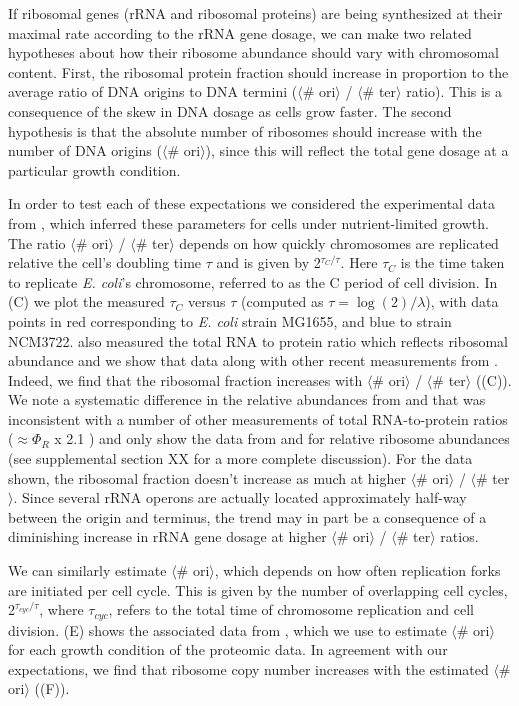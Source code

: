 If ribosomal genes (rRNA and ribosomal proteins) are being synthesized at
their maximal rate according to the rRNA gene dosage, we can make two related
hypotheses about how their ribosome abundance should vary with chromosomal
content. First, the ribosomal protein fraction should increase in proportion
to the average ratio of DNA origins to DNA termini ($\langle$\# ori$\rangle$
/ $\langle$\# ter$\rangle$ ratio). This is a consequence of the skew in DNA
dosage as cells grow faster. The second hypothesis is that the absolute
number of ribosomes should increase with the number of DNA origins
($\langle$\# ori$\rangle$), since this will reflect the total gene dosage at
a particular growth condition.

In order to test each of these expectations we considered the experimental data
from \cite{si2017}, which inferred these parameters for cells under
nutrient-limited growth. The ratio $\langle$\# ori$\rangle$ / $\langle$\#
ter$\rangle$ depends on how quickly chromosomes are replicated relative the
cell's doubling time $\tau$ and is given by 2$^{\tau_C / \tau}$. Here $\tau_C$
is the time taken to replicate \textit{E. coli}'s chromosome, referred to as the
C period of cell division.  In (C) we plot the measured
$\tau_C$ versus $\tau$ (computed as $\tau = \log (2) / \lambda$), with data
points in red corresponding to \textit{E. coli} strain MG1655, and blue to
strain NCM3722. \cite{si2017} also measured the total RNA to protein ratio
which reflects ribosomal abundance and we show that data along with other recent
measurements from \cite{dai2016,dai2018}. Indeed, we find that the ribosomal
fraction increases with $\langle$\# ori$\rangle$ / $\langle$\# ter$\rangle$
((C)). We note a systematic difference in the relative
abundances from \cite{peebo2015} and \cite{valgepea2013} that was inconsistent
with a number of other measurements of total RNA-to-protein ratios ($\approx
\Phi_R$ x 2.1 \cite{dai2016}) and only show the data from \cite{schmidt2016} and
\cite{li2014} for relative ribosome abundances (see supplemental section XX for
a more complete discussion). For the data shown, the ribosomal fraction doesn't
increase as much at higher $\langle$\# ori$\rangle$ / $\langle$\# ter$\rangle$.
Since several rRNA operons are actually located approximately half-way between
the origin and terminus, the trend may in part be a consequence of a diminishing
increase in rRNA gene dosage at higher $\langle$\# ori$\rangle$ / $\langle$\#
ter$\rangle$ ratios.

We can similarly estimate $\langle$\# ori$\rangle$, which depends on how often
replication forks are initiated per cell cycle. This is given by the number of
overlapping cell cycles,  2$^{\tau_{cyc} / \tau}$, where $\tau_{cyc}$, refers to
the total time of chromosome replication and cell division.
(E) shows the associated data from \cite{si2019},
which we use to estimate $\langle$\# ori$\rangle$  for each growth condition of
the proteomic data. In agreement with our expectations, we find that ribosome
copy number increases with the estimated $\langle$\# ori$\rangle$
((F)).

